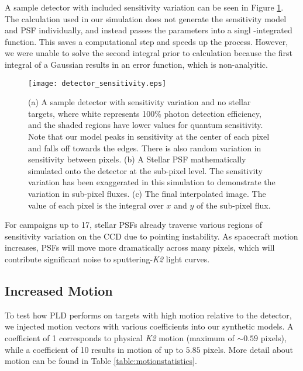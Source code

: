 \documentclass[12pt,preprint]{aastex}
\begin{document}
A sample detector with included sensitivity variation can be seen in Figure \ref{fig:detector_sensitivity}. The calculation used in our simulation does not generate the sensitivity model and PSF individually, and instead passes the parameters into a singl -integrated function. This saves a computational step and speeds up the process. However, we were unable to solve the second integral prior to calculation because the first integral of a Gaussian results in an error function, which is non-analyitic.

\begin{figure}[h]
	\centering
	\texttt{[image: detector\_sensitivity.eps]}
	\caption{(a) A sample detector with sensitivity variation and no stellar targets, where white represents 100\% photon detection efficiency, and the shaded regions have lower values for quantum sensitivity. Note that our model peaks in sensitivity at the center of each pixel and falls off towards the edges. There is also random variation in sensitivity between pixels. (b) A Stellar PSF mathematically simulated onto the detector at the sub-pixel level. The sensitivity variation has been exaggerated in this simulation to demonstrate the variation in sub-pixel fluxes. (c) The final interpolated image. The value of each pixel is the integral over $x$ and $y$ of the sub-pixel flux.}
	\label{fig:detector_sensitivity}
\end{figure}

For campaigns up to 17, stellar PSFs already traverse various regions of sensitivity variation on the CCD due to pointing instability. As spacecraft motion increases, PSFs will move more dramatically across many pixels, which will contribute significant noise to sputtering-\textit{K2} light curves.

\subsection{Increased Motion}

To test how PLD performs on targets with high motion relative to the detector, we injected motion vectors with various coefficients into our synthetic models. A coefficient of 1 corresponds to physical \textit{K2} motion (maximum of $\sim 0.59$ pixels), while a coefficient of 10 results in motion of up to $5.85$ pixels. More detail about motion can be found in Table \ref{table:motionstatistics}.
\end{document}
